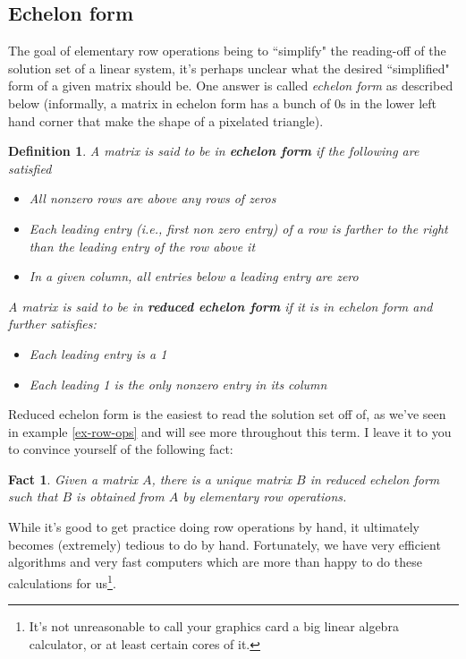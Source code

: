 \documentclass[12pt]{article}
\numberwithin{equation}{subsection}
\numberwithin{figure}{subsection}
\newtheorem{defn}[subsection]{Definition}
\newtheorem{fact}[subsection]{Fact}
\theoremstyle{note}
\begin{document}
\subsection{Echelon form}
The goal of elementary row operations being to ``simplify" the reading-off of the solution set of a linear system, it's perhaps unclear what the desired ``simplified" form of a given matrix should be. One answer is called \textit{echelon %
 form} as described below (informally, a matrix in echelon form has a bunch of 0s in the lower left hand corner that make the shape of a pixelated triangle).
\begin{defn}
	A matrix is said to be in \textbf{echelon form} if the following are satisfied
	\begin{itemize}
		\item All nonzero rows are above any rows of zeros
		\item Each leading entry (i.e., first non zero entry) of a row is farther to the right than the leading entry of the row above it
		\item In a given column, all entries below a leading entry are zero
	\end{itemize}
	A matrix is said to be in \textbf{reduced echelon form} if it is in echelon form and further satisfies:
	\begin{itemize}
		\item Each leading entry is a 1
		\item Each leading 1 is the only nonzero entry in its column
	\end{itemize}
\end{defn}
Reduced echelon form is the easiest to read the solution set off of, as we've seen in example \ref{ex-row-ops} and will see more throughout this term. I leave it to you to convince yourself of the following fact:
\begin{fact} Given a matrix $A$, there is a unique matrix $B$ in reduced echelon form such that $B$ is obtained from $A$ by elementary row operations. 
\end{fact}
While it's good to get practice doing row operations by hand, it ultimately becomes (extremely) tedious to do by hand. Fortunately, we have very efficient algorithms and very fast computers which are more than happy to do these calculations for us\footnote{It's not unreasonable to call your graphics card a big linear algebra calculator, or at least certain cores of it.}.
\end{document}
